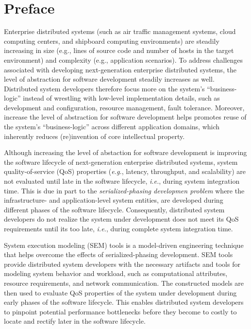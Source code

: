
\chapter*{Preface}
\label{sec:preface}

Enterprise distributed systems (such as air traffic management systems, 
cloud computing centers, and shipboard computing environments) are steadily 
increasing in size (e.g., lines of source code and number of hosts in the 
target environment) and complexity (e.g., application scenarios). To address 
challenges associated with developing next-generation enterprise distributed 
systems, the level of abstraction for software development steadily increases
as well. Distributed system developers therefore focus more on the system's
``business-logic'' instead of wrestling with low-level implementation details, 
such as development and configuration, resource management, fault tolerance. 
Moreover, increase the level of abstraction for software development helps
promotes reuse of the system's ``business-logic'' across different application 
domains, which inherently reduces (re)invention of core intellectual property.

Although increasing the level of abstaction for software development is improving 
the software lifecycle of next-generation enterprise distributed systems, system 
quality-of-service (QoS) properties (\textit{e.g.}, latency, throughput, and 
scalability) are not evaluated until late in the software lifecycle, \textit{i.e.}, 
during system integration time. This is due in part to the \textit{serialized-phasing 
developmen problem} where the infrastructure- and application-level system entities, 
are developed during different phases of the software lifecycle. Consequently, 
distributed system developers do not realize the system under development does 
not meet its QoS requirements until its too late, \textit{i.e.}, during complete 
system integration time.

System execution modeling (SEM) tools is a model-driven engineering technique
that helps overcome the effects of serialized-phasing development. SEM tools
provide distributed system developers with the necessary artifacts and tools 
for modeling system behavior and workload, such as computational attributes, 
resource requirements, and network communication. The constructed models are
then used to evaluate QoS properties of the system under development during
early phases of the software lifecycle. This enables distributed system 
developers to pinpoint potential performance bottlenecks before they become
to costly to locate and rectify later in the software lifecycle.

